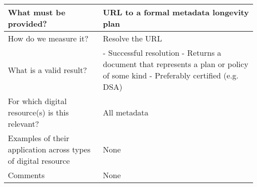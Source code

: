\documentclass[english]{article}
\begin{document}
\begin{longtable}{|p{5cm}|p{9cm}|}
\hline
What must be provided? &  


URL to a formal metadata longevity plan


\\



\hline
How do we measure it? &  

Resolve the URL


\\



\hline
What is a valid result? &  



- Successful resolution\newline 
- Returns a document that represents a plan or policy of some kind\newline 
- Preferably certified (e.g. DSA)\newline 



\\



\hline
For which digital resource(s) is this relevant? &  All metadata\\



\hline
Examples of their application across types of digital resource &  None

\\



\hline

Comments & None 

\\
\hline

\end{longtable}
\end{document}
